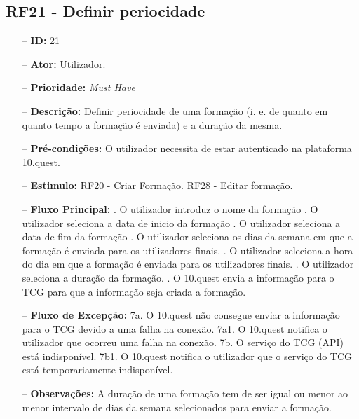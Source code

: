 \subsection{RF21 - Definir periocidade}
\begin{itemize}
	\item[--] \textbf{ID:} 21
	\item[--]  \textbf{Ator:} Utilizador.
	\item[--]  \textbf{Prioridade:} \textit{Must Have}
	\item[--]  \textbf{Descrição:} Definir periocidade de uma formação (i. e. de quanto em quanto tempo a formação é enviada) e a duração da mesma.
	\item[--]  \textbf{Pré-condições:} O utilizador necessita de estar autenticado na plataforma 10.quest.
	\item[--]  \textbf{Estimulo:}
		\subitem RF20 - Criar Formação.
		\subitem RF28 - Editar formação.
	\item[--]  \textbf{Fluxo Principal:} 
		. O utilizador introduz o nome da formação
		. O utilizador seleciona a data de inicio da formação
		. O utilizador seleciona a data de fim da formação
		. O utilizador seleciona os dias da semana em que a formação é enviada para os utilizadores finais.
		. O utilizador seleciona a hora do dia em que a formação é enviada para os utilizadores finais.
		. O utilizador seleciona a duração da formação.
		. O 10.quest envia a informação para o TCG para que a informação seja criada a formação.
	\item[--]  \textbf{Fluxo de Excepção:} 
		\subitem 7a. O 10.quest não consegue enviar a informação para o TCG devido a uma falha na conexão.
		\subitem 7a1. O 10.quest notifica o utilizador que ocorreu uma falha na conexão.
		\subitem 7b. O serviço do TCG (API) está indisponível.
		\subitem 7b1. O 10.quest notifica o utilizador que o serviço do TCG está temporariamente indisponível. 
	\item[--]  \textbf{Observações:} A duração de uma formação tem de ser igual ou menor ao menor intervalo de dias da semana selecionados para enviar a formação.
\end{itemize}
\newpage

